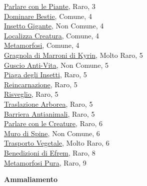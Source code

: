 \begin{multicols}{3}
{{\hyperlink{Parlare con le Piante}{Parlare con le Piante}, Raro, 3\\
\hyperlink{Dominare Bestie}{Dominare Bestie}, Comune, 4\\
\hyperlink{Insetto Gigante}{Insetto Gigante}, Non Comune, 4\\
\hyperlink{Localizza Creatura}{Localizza Creatura}, Comune, 4\\
\hyperlink{Metamorfosi}{Metamorfosi}, Comune, 4\\
\hyperlink{Gragnola di Marroni di Kyrin}{Gragnola di Marroni di Kyrin}, Molto Raro, 5\\
\hyperlink{Guscio Anti-Vita}{Guscio Anti-Vita}, Non Comune, 5\\
\hyperlink{Piaga degli Insetti}{Piaga degli Insetti}, Raro, 5\\
\hyperlink{Reincarnazione}{Reincarnazione}, Raro, 5\\
\hyperlink{Risveglio}{Risveglio}, Raro, 5\\
\hyperlink{Traslazione Arborea}{Traslazione Arborea}, Raro, 5\\
\hyperlink{Barriera Antianimali}{Barriera Antianimali}, Raro, 5\\
\hyperlink{Parlare con le Creature}{Parlare con le Creature}, Raro, 6\\
\hyperlink{Muro di Spine}{Muro di Spine}, Non Comune, 6\\
\hyperlink{Trasporto Vegetale}{Trasporto Vegetale}, Molto Raro, 6\\
\hyperlink{Benedizioni di Efrem}{Benedizioni di Efrem}, Raro, 8\\
\hyperlink{Metamorfosi Pura}{Metamorfosi Pura}, Raro, 9

\medskip\textbf{Ammaliamento}

}}
\end{multicols}
